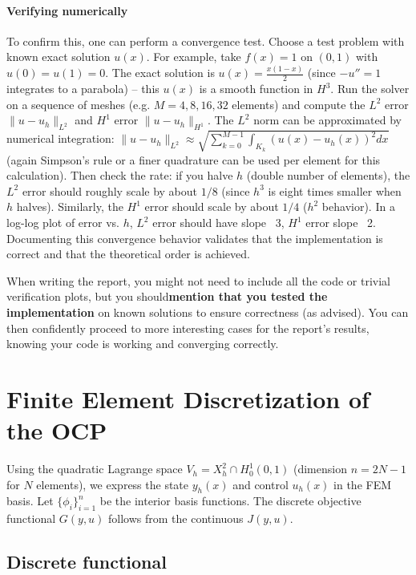 \documentclass[a4paper,10pt]{article}
\begin{document}
\paragraph{Verifying numerically}
To confirm this, one can perform a convergence test.
Choose a test problem with known exact solution \(u(x)\). For example, take \(f(x)=1\) on \((0,1)\) with \(u(0)=u(1)=0\). The exact solution is \(u(x) = \frac{x(1-x)}{2}\) (since \(-u''=1\) integrates to a parabola) – this \(u(x)\) is a smooth function in \(H^3\). Run the solver on a sequence of meshes (e.g. \(M=4,8,16,32\) elements) and compute the \(L^2\) error \(\|u - u_h\|_{L^2}\) and \(H^1\) error \(\|u-u_h\|_{H^1}\). The \(L^2\) norm can be approximated by numerical integration: \(\|u - u_h\|_{L^2} \approx \sqrt{\sum_{k=0}^{M-1}\int_{K_k} (u(x)-u_h(x))^2 dx}\) (again Simpson's rule or a finer quadrature can be used per element for this calculation). Then check the rate: if you halve \(h\) (double number of elements), the \(L^2\) error should roughly scale by about \(1/8\) (since \(h^3\) is eight times smaller when \(h\) halves). Similarly, the \(H^1\) error should scale by about \(1/4\) (\(h^2\) behavior). In a log-log plot of error vs. \(h\), \(L^2\) error should have slope ~3, \(H^1\) error slope ~2. Documenting this convergence behavior validates that the implementation is correct and that the theoretical order is achieved.

When writing the report, you might not need to include all the code or trivial verification plots, but you should\textbf{mention that you tested the implementation} on known solutions to ensure correctness (as advised).
You can then confidently proceed to more interesting cases for the report's results, knowing your code is working and converging correctly.

\section{Finite Element Discretization of the OCP}
Using the quadratic Lagrange space \(V_h = X_h^2 \cap H^1_0(0,1)\) (dimension \(n=2N-1\) for \(N\) elements), we express the state \(y_h(x)\) and control \(u_h(x)\) in the FEM basis.
Let \(\{\phi_i\}_{i=1}^n\) be the interior basis functions. The discrete objective functional \(G(y,u)\) follows from the continuous \(J(y,u)\).

\subsection{Discrete functional}
\end{document}
